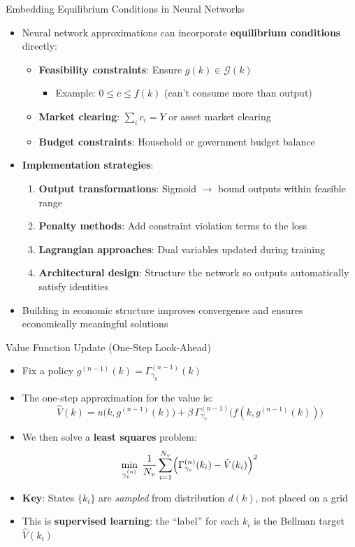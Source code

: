 \documentclass[10pt,english,aspectratio=169]{beamer}
\begin{document}
\begin{frame}{Embedding Equilibrium Conditions in Neural Networks}
\begin{itemize}
  \item Neural network approximations can incorporate \textbf{equilibrium conditions} directly:
    \begin{itemize}
      \item \textbf{Feasibility constraints}: Ensure $g(k) \in \mathcal{G}(k)$
        \begin{itemize}
          \item Example: $0 \leq c \leq f(k)$ (can't consume more than output)
        \end{itemize}
      \item \textbf{Market clearing}: $\sum_i c_i = Y$ or asset market clearing
      \item \textbf{Budget constraints}: Household or government budget balance
    \end{itemize}
  \medskip
  \item \textbf{Implementation strategies}:
    \begin{enumerate}
      \item \textbf{Output transformations}: Sigmoid $\to$ bound outputs within feasible range
      \item \textbf{Penalty methods}: Add constraint violation terms to the loss
      \item \textbf{Lagrangian approaches}: Dual variables updated during training
      \item \textbf{Architectural design}: Structure the network so outputs automatically satisfy identities
    \end{enumerate}
  \medskip
  \item Building in economic structure improves convergence and ensures economically meaningful solutions
\end{itemize}
\end{frame}

\begin{frame}{Value Function Update (One-Step Look-Ahead)}
\begin{itemize}
  \item Fix a policy $g^{(n-1)}(k) = \Gamma_{\gamma_g}^{(n-1)}(k)$
  \item The one-step approximation for the value is:
    \[
      \hat{V}(k) = u\bigl(k, g^{(n-1)}(k)\bigr) + \beta\, \Gamma_{\gamma_v}^{(n-1)}\bigl(f(k, g^{(n-1)}(k))\bigr)
    \]
  \item We then solve a \textbf{least squares} problem:
    \[
      \min_{\gamma_v^{(n)}} \; \frac{1}{N_v}\sum_{i=1}^{N_v} \Bigl(\Gamma_{\gamma_v}^{(n)}(k_i) - \hat{V}(k_i)\Bigr)^2
    \]
  \medskip
  \item \textbf{Key}: States $\{k_i\}$ are \emph{sampled} from distribution $d(k)$, not placed on a grid
  \item This is \textbf{supervised learning}: the ``label'' for each $k_i$ is the Bellman target $\hat{V}(k_i)$
\end{itemize}
\end{frame}
\end{document}
